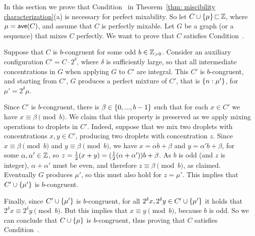 

%

In this section we prove that Condition~{\MixCond} in 
Theorem~\ref{thm: miscibility characterization}(a) is necessary for perfect mixability.
So let $C\cup { \left\{ \mu \right\} }{\,\sqsubset\,}{\mathbb Z}$, where $\mu = {\textsf{ave}}(C)$, and assume that
$C$ is perfectly mixable. Let $G$ be a graph (or a sequence) that mixes $C$ perfectly.
We want to prove that $C$ satisfies Condition~{\MixCond}.

Suppose that $C$ is $b$-congruent for some odd $b\in{\mathbb{Z}_{> 0}}$.
Consider an auxiliary configuration
$C' = C\cdot 2^\delta$, where $\delta$ is sufficiently large, so that all
intermediate concentrations in $G$ when applying $G$ to $C'$ are integral. 
This $C'$ is $b$-congruent, and starting from $C'$, $G$ produces a perfect mixture of $C'$,
that is ${ \left\{ n:\mu' \right\} }$, for $\mu' = 2^\delta\mu$.

Since $C'$ is $b$-congruent, there is $\beta\in{ \left\{ 0,...,b-1 \right\} }$ such that
for each $x\in C'$ we have $x\equiv \beta \pmod{b}$.
We claim that this property is preserved as we apply mixing operations to
droplets in $C'$. Indeed, suppose that we mix two droplets with concentrations
$x,y\in C'$, producing two droplets with concentration $z$.  
Since $x\equiv \beta \pmod{b}$ and $y\equiv \beta \pmod{b}$,
we have $x = \alpha b + \beta$ and $y = \alpha' b + \beta$, for some $\alpha, \alpha'\in {\mathbb Z}$,
so $z = {\textstyle\frac{1}{2}}(x+y) = ({\textstyle\frac{1}{2}}(\alpha+\alpha'))b + \beta$. As $b$ is odd
(and $z$ is integer), $\alpha+\alpha'$ must be even, and therefore
$z\equiv \beta \pmod{b}$, as claimed. Eventually $G$ produces $\mu'$,
so this must also hold for $z = \mu'$. This implies that 
$C'\cup{ \left\{ \mu' \right\} }$ is $b$-congruent.

Finally, since $C'\cup{ \left\{ \mu' \right\} }$ is $b$-congruent, for
all $2^\delta x, 2^\delta y\in C'\cup{ \left\{ \mu' \right\} }$ it holds
that $2^\delta x \equiv 2^\delta y \pmod{b}$. 
But this implies that  $x \equiv y \pmod{b}$, because
$b$ is odd. So we can conclude that 
$C\cup{ \left\{ \mu \right\} }$ is $b$-congruent, thus proving that
$C$ satisfies Condition~{\MixCond}.
